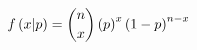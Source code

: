 \documentclass[varwidth,border=1pt]{standalone}
\begin{document}
  \[
    \textcolor{default}{
    	f\left(x\middle|p\right)={n\choose x} \left(p\right)^x \left(1-p\right)^{n-x}
    }
  \]
  
\end{document}

